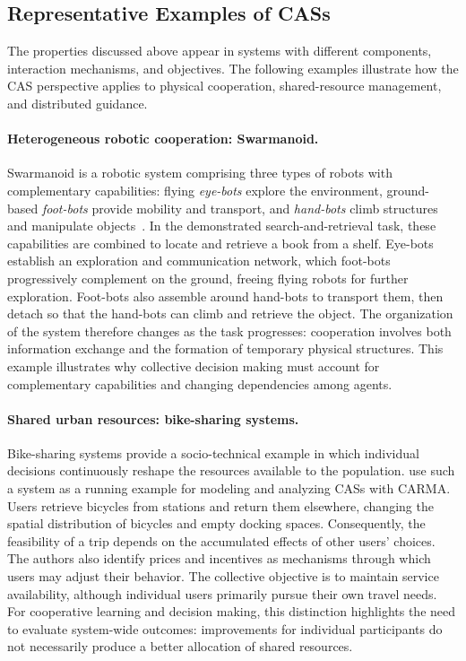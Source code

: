 \subsection{Representative Examples of CASs}
\label{sec:cas-examples}

The properties discussed above appear in systems with different components,
 interaction mechanisms, and objectives.
%
The following examples illustrate how the CAS perspective applies to physical cooperation, 
 shared-resource management, and distributed guidance.

\paragraph{Heterogeneous robotic cooperation: Swarmanoid.}
Swarmanoid is a robotic system comprising three types of robots 
 with complementary capabilities: flying \emph{eye-bots} explore the environment,
 ground-based \emph{foot-bots} provide mobility and transport,
 and \emph{hand-bots} climb structures and manipulate objects~\cite{DBLP:journals/ram/Dorigo13}.
%
In the demonstrated search-and-retrieval task,
 these capabilities are combined to locate and retrieve a book from a shelf.
%
Eye-bots establish an exploration and communication network,
 which foot-bots progressively complement on the ground,
 freeing flying robots for further exploration.
%
Foot-bots also assemble around hand-bots to transport them,
 then detach so that the hand-bots can climb and retrieve the object.
%
The organization of the system therefore changes as the task progresses:
 cooperation involves both information exchange 
 and the formation of temporary physical structures.
%
This example illustrates why collective decision making must account 
 for complementary capabilities and changing dependencies among agents.

\paragraph{Shared urban resources: bike-sharing systems.}
Bike-sharing systems provide a socio-technical example 
 in which individual decisions continuously reshape the resources available
 to the population.
%
\cite{DBLP:conf/sfm/LoretiH16} use such a system as a running example
 for modeling and analyzing CASs with CARMA.
%
Users retrieve bicycles from stations and return them elsewhere,
 changing the spatial distribution of bicycles and empty docking spaces.
%
Consequently, 
 the feasibility of a trip depends on the accumulated effects of other users' choices.
%
The authors also identify prices and incentives as mechanisms
 through which users may adjust their behavior.
%
The collective objective is to maintain service availability,
 although individual users primarily pursue their own travel needs.
%
For cooperative learning and decision making,
 this distinction highlights the need to evaluate system-wide outcomes:
 improvements for individual participants do not necessarily produce
 a better allocation of shared resources.

